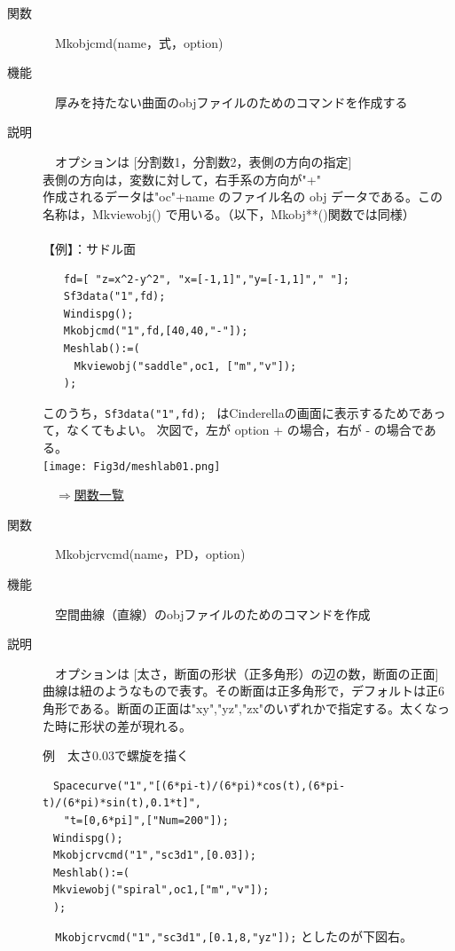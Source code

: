 \documentclass[papersize,a4paper,12pt,uplatex]{jsarticle}
\begin{document}
\begin{description}

\hypertarget{mkobjcmd}{}
\item[関数]　Mkobjcmd(name，式，option)
\item[機能]　厚みを持たない曲面のobjファイルのためのコマンドを作成する
\item[説明]　オプションは [分割数1，分割数2，表側の方向の指定]\\
表側の方向は，変数に対して，右手系の方向が"+"\\
作成されるデータは"oc"+name のファイル名の obj データである。この名称は，Mkviewobj() で用いる。（以下，Mkobj**()関数では同様）\\
\\
【例】：サドル面
\begin{verbatim}
　　fd=[ "z=x^2-y^2", "x=[-1,1]","y=[-1,1]"," "];
　　Sf3data("1",fd);
　　Windispg();
　　Mkobjcmd("1",fd,[40,40,"-"]); 
　　Meshlab():=(
　　　Mkviewobj("saddle",oc1, ["m","v"]); 
　　);
\end{verbatim}
このうち，\verb|Sf3data("1",fd); | はCinderellaの画面に表示するためであって，なくてもよい。
次図で，左が option + の場合，右が - の場合である。\\
\texttt{[image: Fig3d/meshlab01.png]}
　\\
\begin{flushright}　\hyperlink{functionlist}{$\Rightarrow$関数一覧}\end{flushright}

\hypertarget{mkobjcrvcmd}{}
\item[関数]　Mkobjcrvcmd(name，PD，option)
\item[機能]　空間曲線（直線）のobjファイルのためのコマンドを作成
\item[説明]　オプションは [太さ，断面の形状（正多角形）の辺の数，断面の正面]\\
曲線は紐のようなもので表す。その断面は正多角形で，デフォルトは正6角形である。断面の正面は"xy","yz","zx"のいずれかで指定する。太くなった時に形状の差が現れる。

例　太さ0.03で螺旋を描く
\begin{verbatim}
　Spacecurve("1","[(6*pi-t)/(6*pi)*cos(t),(6*pi-t)/(6*pi)*sin(t),0.1*t]",
　　"t=[0,6*pi]",["Num=200"]);
　Windispg();
　Mkobjcrvcmd("1","sc3d1",[0.03]);
　Meshlab():=(
　Mkviewobj("spiral",oc1,["m","v"]); 
　);
\end{verbatim}

\verb|  Mkobjcrvcmd("1","sc3d1",[0.1,8,"yz"]);| としたのが下図右。\\
  

\end{description}
\end{document}
